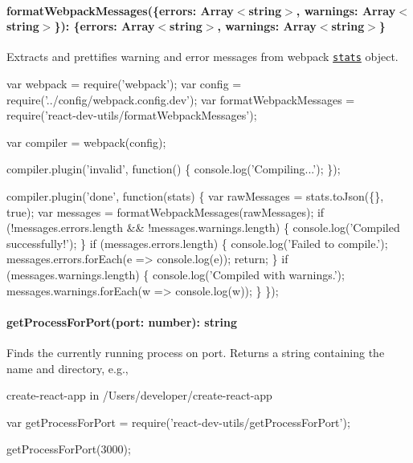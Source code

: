 \paragraph*{{\ttfamily format\+Webpack\+Messages(\{errors\+: Array$<$string$>$, warnings\+: Array$<$string$>$\})\+: \{errors\+: Array$<$string$>$, warnings\+: Array$<$string$>$\}}}

Extracts and prettifies warning and error messages from webpack \href{https://github.com/webpack/docs/wiki/node.js-api#stats}{\tt stats} object.


\begin{DoxyCode}
var webpack = require('webpack');
var config = require('../config/webpack.config.dev');
var formatWebpackMessages = require('react-dev-utils/formatWebpackMessages');

var compiler = webpack(config);

compiler.plugin('invalid', function() \{
  console.log('Compiling...');
\});

compiler.plugin('done', function(stats) \{
  var rawMessages = stats.toJson(\{\}, true);
  var messages = formatWebpackMessages(rawMessages);
  if (!messages.errors.length && !messages.warnings.length) \{
    console.log('Compiled successfully!');
  \}
  if (messages.errors.length) \{
    console.log('Failed to compile.');
    messages.errors.forEach(e => console.log(e));
    return;
  \}
  if (messages.warnings.length) \{
    console.log('Compiled with warnings.');
    messages.warnings.forEach(w => console.log(w));
  \}
\});
\end{DoxyCode}


\paragraph*{{\ttfamily get\+Process\+For\+Port(port\+: number)\+: string}}

Finds the currently running process on {\ttfamily port}. Returns a string containing the name and directory, e.\+g.,


\begin{DoxyCode}
create-react-app
in /Users/developer/create-react-app
\end{DoxyCode}



\begin{DoxyCode}
var getProcessForPort = require('react-dev-utils/getProcessForPort');

getProcessForPort(3000);
\end{DoxyCode}



